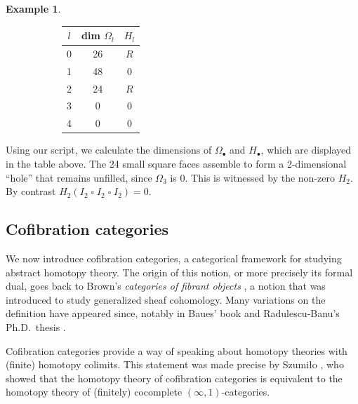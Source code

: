 \documentclass[11pt]{article}
\theoremstyle{definition}
\newtheorem{example}[theo]{Example}
\numberwithin{equation}{section}
\newcommand{\gtimes}{\mathbin{\square}}
\begin{document}
\begin{example}
\begin{figure}[H]
\begin{subfigure}[c]{0.55\textwidth}
        \end{subfigure}
        \begin{subfigure}[c]{0.35\textwidth}
        \centering
        \begin{tabular}{||c||  c | c||} 
         \hline
         $l$ &  dim $\Omega_l$ & $H_l$ \\ [.5ex] 
         \hline\hline
        0 &  26 & $R$ \\ 
         \hline
         1 & 48 & 0 \\
         \hline
          2 & 24 & $R$ \\
         \hline
          3 & 0 & 0 \\
           \hline
          4 & 0 & 0 \\
         \hline
        \end{tabular}
        \end{subfigure}
    \end{figure}  
    Using our script, we calculate the dimensions of $\Omega_\bullet$ and $H_\bullet$, which are displayed in the table above.
    The 24 small square faces assemble to form a 2-dimensional ``hole'' that remains unfilled, since $\Omega_3$ is 0.
    This is witnessed by the non-zero $H_2$.
    By contrast $H_2(I_2 \gtimes I_2 \gtimes I_2) = 0$.
\end{example}

\subsection{Cofibration categories}

We now introduce cofibration categories, a categorical framework for studying abstract homotopy theory.
The origin of this notion, or more precisely its formal dual, goes back to Brown's \emph{categories of fibrant objects} \cite{brown:abstract-homotopy-theory}, a notion that was introduced to study generalized sheaf cohomology.
Many variations on the definition have appeared since, notably in Baues' book \cite{baues:algebraic-homotopy} and Radulescu-Banu's Ph.D.~thesis \cite{radulescu-banu}.

Cofibration categories provide a way of speaking about homotopy theories with (finite) homotopy colimits.
This statement was made precise by Szumi{\l}o \cite{szumilo:two-models}, who showed that the homotopy theory of cofibration categories is equivalent to the homotopy theory of (finitely) cocomplete $(\infty, 1)$-categories.
\end{document}
